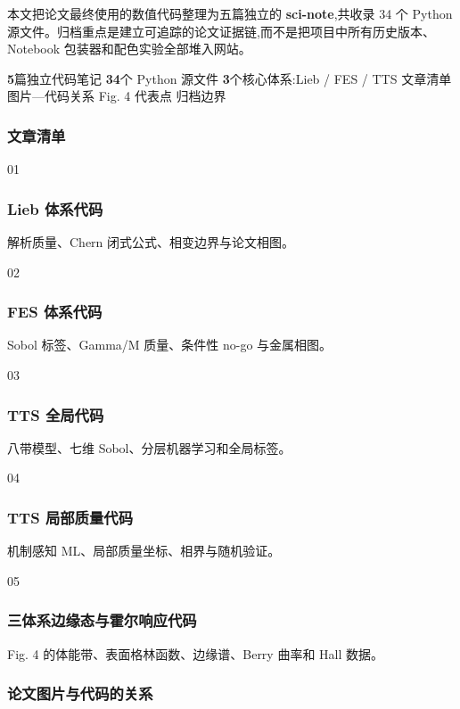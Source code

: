 \documentclass[lang=cn,scheme=chinese,color=blue,device=normal,toc=onecol,math=cm]{elegantbook}
\begin{document}
本文把论文最终使用的数值代码整理为五篇独立的 \textbf{sci-note},共收录 34 个 Python 源文件。归档重点是建立可追踪的论文证据链,而不是把项目中所有历史版本、Notebook 包装器和配色实验全部堆入网站。\par

 \textbf{5}篇独立代码笔记 \textbf{34}个 Python 源文件 \textbf{3}个核心体系:Lieb /\allowbreak{} FES /\allowbreak{} TTS 
 文章清单 图片—代码关系 Fig. 4 代表点 归档边界 

\subsubsection{文章清单}

  01
\subsubsection{Lieb 体系代码}
 
解析质量、Chern 闭式公式、相变边界与论文相图。\par
   02
\subsubsection{FES 体系代码}
 
Sobol 标签、Gamma/\allowbreak{}M 质量、条件性 no-go 与金属相图。\par
   03
\subsubsection{TTS 全局代码}
 
八带模型、七维 Sobol、分层机器学习和全局标签。\par
   04
\subsubsection{TTS 局部质量代码}
 
机制感知 ML、局部质量坐标、相界与随机验证。\par
   05
\subsubsection{三体系边缘态与霍尔响应代码}
 
Fig. 4 的体能带、表面格林函数、边缘谱、Berry 曲率和 Hall 数据。\par
  

\subsubsection{论文图片与代码的关系}
\end{document}
